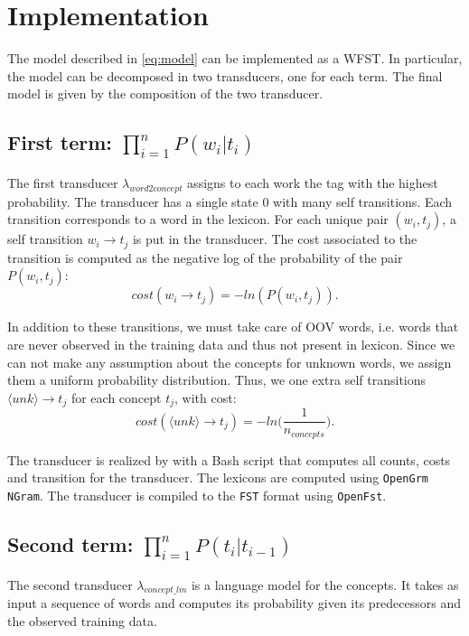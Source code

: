 \section{Implementation}
\label{sec:implementation}

The model described in \cref{eq:model} can be implemented as a \ac{WFST}.
In particular, the model can be decomposed in two transducers, one for each term.
The final model is given by the composition of the two transducer.

\subsection{First term: $\prod_{i=1}^n P(w_i | t_i)$}
The first transducer $\lambda_{word2concept}$ assigns to each work the tag with the highest probability.
The transducer has a single state $0$ with many self transitions.
Each transition corresponds to a word in the lexicon.
For each unique pair $(w_i, t_j)$, a self transition $w_i \rightarrow t_j$ is put in the transducer.
The cost associated to the transition is computed as the negative log of the probability of the pair $P(w_i, t_j)$:
\begin{equation*}
    cost(w_i \rightarrow t_j) = -ln(P(w_i, t_j)).
\end{equation*}

In addition to these transitions, we must take care of \ac{OOV} words, i.e. words that are never observed in the training data and thus not present in lexicon.
Since we can not make any assumption about the concepts for unknown words, we assign them a uniform probability distribution.
Thus, we one extra self transitions $\langle unk \rangle \rightarrow t_j$ for each concept $t_j$, with cost:
\begin{equation*}
    cost(\langle unk \rangle \rightarrow t_j) = -ln \Big( \frac{1}{n_{concepts}} \Big).
\end{equation*}

The transducer is realized by with a Bash script that computes all counts, costs and transition for the transducer.
The lexicons are computed using \texttt{OpenGrm NGram}.
The transducer is compiled to the \texttt{FST} format using \texttt{OpenFst}.

\subsection{Second term: $\prod_{i=1}^n P(t_i | t_{i-1})$}
The second transducer $\lambda_{concept\_lm}$ is a language model for the concepts.
It takes as input a sequence of words and computes its probability given its predecessors and the observed training data.

